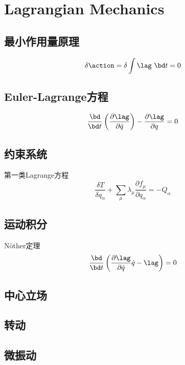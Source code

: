 
\chapter{Lagrangian Mechanics}
\section{最小作用量原理}
\label{sec:princ_least_action}
\begin{equation}
    \delta \action = \delta \int \lag ~\bd t = 0
\end{equation}

\section{Euler-Lagrange方程}

\begin{equation}
    \frac{\bd}{\bd t} \left(\frac{\partial\lag}{\partial \dot{q}} \right)-\frac{\partial\lag}{\partial q}  = 0
\end{equation}
\section{约束系统}
\label{sec:constraint}
第一类Lagrange方程\cite{Lagrange1788a}
\begin{equation}
    \frac{\delta T}{\delta q_\alpha} + \sum_\mu \lambda_\mu \frac{\partial f_\mu}{\partial q_\alpha}=-Q_\alpha
\end{equation}

\section{运动积分}
\label{sec:noether_theo}

N\"other定理
\begin{equation}
    \frac{\bd}{\bd t} \left( \frac{\partial \lag}{\partial \dot{q}}\dot{q}-\lag \right)=0
\end{equation}

\section{中心立场}
\label{sec:celestial_pot}
\section{转动}
\label{sec:rotation}
\section{微振动}
\label{sec:micro_vibration}